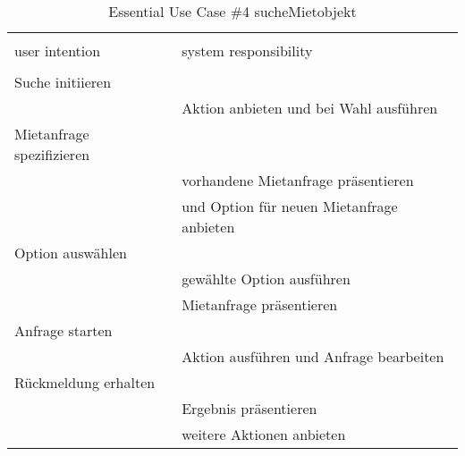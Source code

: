 \begin{table}[H]
\caption{Essential Use Case \#4 sucheMietobjekt }
\centering
\begin{tabular}{l l}
\\ [-0.5ex]

\hline\hline
\\ [-0.5ex]
user intention & system responsibility
\\ [1.5ex]
\hline
\\ [-0.5ex]
Suche initiieren        &                                 \\[1ex]
                     & Aktion anbieten und bei Wahl ausführen   \\[1ex]
Mietanfrage spezifizieren  &                                 \\[1ex]
                     & vorhandene Mietanfrage präsentieren      \\[1ex]
                     & und Option für neuen Mietanfrage anbieten  \\[1ex]
Option auswählen           &                                 \\[1ex] 
                     & gewählte Option ausführen                \\[1ex]
                     & Mietanfrage präsentieren                 \\[1ex]
Anfrage starten         &                                 \\[1ex] 
                     & Aktion ausführen und Anfrage bearbeiten  \\[1ex]
Rückmeldung erhalten    &                                 \\[1ex]
                     & Ergebnis präsentieren                 \\[1ex]
                     & weitere Aktionen anbieten                \\[1ex]


\hline
\end{tabular}
\label{tab:mietobjekt}
\end{table}


